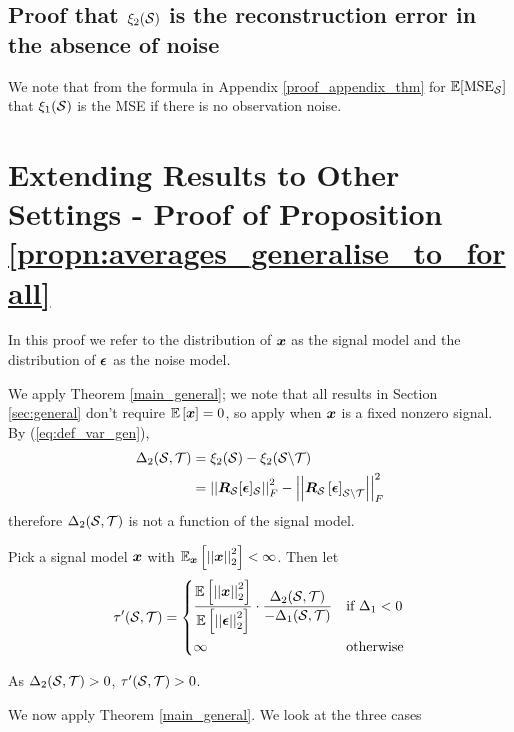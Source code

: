\subsection{Proof that $\xi_2(\mathcal{S})$ is the reconstruction error in the absence of noise}
\label{proof_appendix_noiseless}
We note that from the formula in Appendix \ref{proof_appendix_thm} for $\mathbb{E}[\text{MSE}_{\mathcal{S}}]$ that $\xi_{1}(\mathcal{S})$ is the MSE if there is no observation noise.
\fi

\section{Extending Results to Other Settings - Proof of Proposition \ref{propn:averages_generalise_to_forall}}
\label{app:every_x}
In this proof we refer to the distribution of $\bm{x}$ as the signal model and the distribution of $\bm{\epsilon}$ as the noise model.

We apply Theorem \ref{main_general}; we note that all results in Section \ref{sec:general} don't require $\expect{\vect{x}} = 0$, so apply when $\bm{x}$ is a fixed nonzero signal.  By (\ref{eq:def_var_gen}),
\begin{align}
    \Delta_{2}(\set{S},\set{T}) &= \xi_{2}(\set{S}) - \xi_{2}(\set{S} \backslash \set{T}) \\
    &= \sqfrob{\matr{R}_{\set{S}}\vectsub[S]{\epsilon}} - \sqfrob{\matr{R}_{\set{S}}\msubgen[\set{S} \backslash \set{T}]{\vect{\epsilon}}}
\end{align}
therefore $\Delta_{2}(\mathcal{S},\mathcal{T})$ is not a function of the signal model. %

Pick a signal model $\bm{x}$ with  $\expect[\vect{x}]{\sqnormvec{\vect{x}}} < \infty$. Then let
\begin{align}
    \tau'(\set{S},\set{T}) = \begin{dcases}
  \frac{\expect{\sqnormvec{\vect{x}}}} {\expect{\sqnormvec{\vect{\epsilon}}}} \cdot \frac{\Delta_2(\set{S}, \set{T})}{- \Delta_1(\set{S}, \set{T})}  &\text{if }\Delta_{1} < 0 \\
    \infty &\text{otherwise} 
    \end{dcases}
\end{align}

As ${\Delta_2(\mathcal{S}, \mathcal{T})} > 0$, $\tau'(\mathcal{S},\mathcal{T}) > 0$.

We now apply Theorem \ref{main_general}. We look at the three cases
